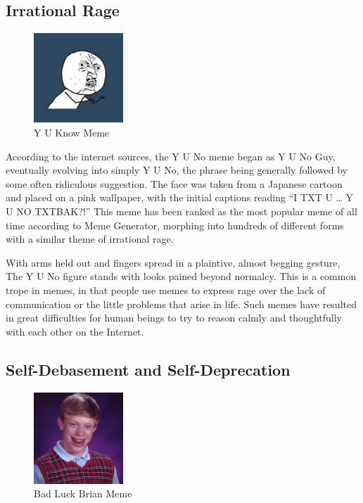 \documentclass[12pt,letterpaper]{article}
\begin{document}
\subsection{Irrational Rage}
\begin{figure}[!h]
	\centering
	\includegraphics[width=0.3\textwidth]{graphics/2}
	\caption{Y U Know Meme}
	\label{1}
\end{figure}
According to the internet sources, the Y U No meme began as Y U No Guy, eventually evolving into simply Y U No, the phrase being generally followed by some often ridiculous suggestion. The face was taken from a Japanese cartoon and placed on a pink wallpaper, with the initial captions reading “I TXT U … Y U NO TXTBAK?!”  This meme has been ranked as the most popular meme of all time according to Meme Generator, morphing into hundreds of different forms with a similar theme of irrational rage.
 
With arms held out and fingers spread in a plaintive, almost begging gesture,  The Y U No figure stands with looks pained beyond normalcy.  This is a common trope in memes, in that people use memes to express rage over the lack of communication or the little problems that arise in life.   Such memes have resulted in great difficulties for human beings to try to reason calmly and thoughtfully with each other on the Internet.

\subsection{Self-Debasement and Self-Deprecation}
\begin{figure}[!h]
	\centering
	\includegraphics[width=0.3\textwidth]{graphics/11}
	\caption{Bad Luck Brian Meme}
	\label{2}
\end{figure}
\end{document}
